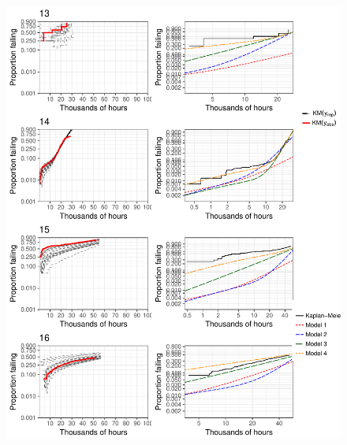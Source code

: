 \documentclass[12pt]{article}
\begin{document}
\begin{figure}[H]
\includegraphics[width=\textwidth]{ppcheck-v2-4.pdf}
\end{figure}
\end{document}
